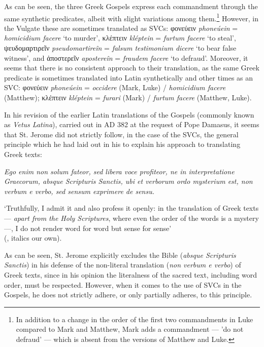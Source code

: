 \documentclass[output=paper,colorlinks,citecolor=brown]{langscibook}
\begin{document}
\z

\z

As can be seen, the three Greek Gospels express each commandment through the same
synthetic predicates, albeit with slight variations among them.\footnote{In addition to a
  change in the order of the first two commandments in Luke compared to Mark and Matthew,
  Mark adds a commandment  --- 'do not defraud' ---  which is absent from the versions of
  Matthew and Luke.} However, in the Vulgate these are sometimes translated as SVCs:
φονεύειν \emph{phoneúein} = \emph{homicidium facere} `to murder', κλέπτειν
\emph{kléptein} = \emph{furtum facere} `to steal', ψευδομαρτιρεῖν
\emph{pseudomartireîn} = \emph{falsum testimonium dicere} `to bear false witness', and
ἀποστερεῖν \emph{apostereîn} = \emph{fraudem facere} `to defraud'. Moreover, it seems
that there is no consistent approach to their translation, as the same Greek predicate is
sometimes translated into Latin synthetically and other times as an SVC: φονεύειν
\emph{phoneúein} = \emph{occidere} (Mark, Luke) / \emph{homicidium facere} (Matthew); κλέπτειν
\emph{kléptein} = \emph{furari} (Mark) / \emph{furtum facere} (Matthew, Luke).

In his revision of the earlier Latin translations of the Gospels (commonly known as
\emph{Vetus Latina}), carried out in AD 382 at the request of Pope Damasus, it seems that
St. Jerome did not strictly follow, in the case of the SVCs, the general principle which he had
laid out in his  to explain his approach to translating Greek
texts:



\eanoraggedright\label{ex:bj:14}

\emph{Ego enim non solum fateor, sed libera voce profiteor, ne in interpretatione
  Graecorum, absque Scripturis Sanctis, ubi et verborum ordo mysterium est, non verbum e
  verbo, sed sensum exprimere de sensu.} 
  
  
  `Truthfully, I admit it and also profess it
openly: in the translation of Greek texts --- \emph{apart from the Holy Scriptures}, where
even the order of the words is a mystery ---, I do not render word for word but sense for
sense' 
\\\hspace*{\fill}(, italics our own).

\z

As can be seen, St. Jerome explicitly excludes the Bible (\emph{absque Scripturis
  Sanctis}) in his defense of the non-literal translation (\emph{non verbum e verbo}) of
Greek texts, since in his opinion the literalness of the sacred text, including word
order, must be respected. However, when it comes to the use of SVCs in the Gospels, he
does not strictly adhere, or only partially adheres, to this principle.
\end{document}
